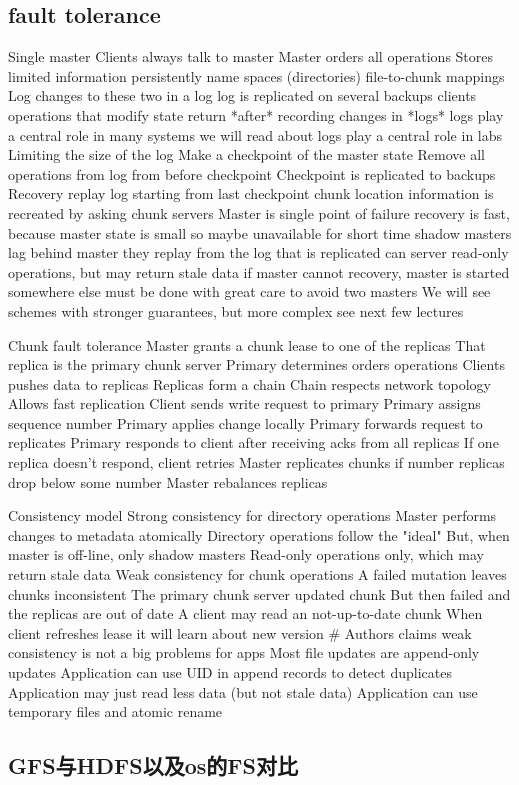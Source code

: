 \subsection{fault tolerance}
  Single master
    Clients always talk to master
    Master orders all operations
  Stores limited information persistently
    name spaces (directories)
    file-to-chunk mappings
  Log changes to these two in a log
    log is replicated on several backups
    clients operations that modify state return *after* recording changes in *logs*
    logs play a central role in many systems we will read about
    logs play a central role in labs
  Limiting the size of the log
    Make a checkpoint of the master state
    Remove all operations from log from before checkpoint
    Checkpoint is replicated to backups
  Recovery
    replay log starting from last checkpoint
    chunk location information is recreated by asking chunk servers
  Master is single point of failure
    recovery is fast, because master state is small
      so maybe unavailable for short time
    shadow masters
      lag behind master
        they replay from the log that is replicated
      can server read-only operations, but may return stale data
    if master cannot recovery, master is started somewhere else
    must be done with great care to avoid two masters
  We will see schemes with stronger guarantees, but more complex
    see next few lectures

Chunk fault tolerance
  Master grants a chunk lease to one of the replicas
    That replica is the primary chunk server
  Primary determines orders operations
  Clients pushes data to replicas
    Replicas form a chain
    Chain respects network topology
    Allows fast replication
  Client sends write request to primary
    Primary assigns sequence number
    Primary applies change locally
    Primary forwards request to replicates
    Primary responds to client after receiving acks from all replicas
  If one replica doesn't respond, client retries
  Master replicates chunks if number replicas drop below some number
  Master rebalances replicas
  
  Consistency model
  Strong consistency for directory operations
    Master performs changes to metadata atomically
    Directory operations follow the "ideal"
    But, when master is off-line, only shadow masters
      Read-only operations only, which may return stale data
  Weak consistency for chunk operations
    A failed mutation leaves chunks inconsistent
      The primary chunk server updated chunk
      But then failed and the replicas are out of date
    A client may read an not-up-to-date chunk
    When client refreshes lease it will learn about new version #
  Authors claims weak consistency is not a big problems for apps    
    Most file updates are append-only updates
      Application can use UID in append records to detect duplicates
      Application may just read less data (but not stale data)
    Application can use temporary files and atomic rename
\subsection{GFS与HDFS以及os的FS对比}
